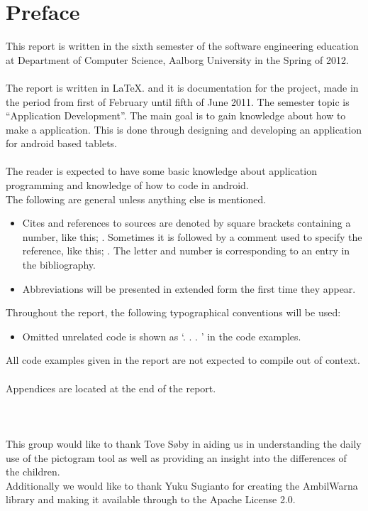 \chapter*{Preface}
This report is written in the sixth semester of the software engineering education at Department of Computer Science, Aalborg University in the Spring of 2012.  \\
\\
The report is written in \LaTeX. and it is documentation for the project, made in the period from first of February until fifth of June 2011.
The semester topic is ``Application Development''. The main goal is to gain knowledge about how to make a application. This is done through designing and developing an application for android based tablets.\\
\\
The reader is expected to have some basic knowledge about application programming and knowledge of how to code in android. \\
The following are general unless anything else is mentioned.

\begin{itemize}
\item Cites and references to sources are denoted by square brackets containing a number,  like this; \cite{XP}. Sometimes it is followed by a comment used to specify the reference, like this; \cite[Comment]{XP}. The letter and number is corresponding to an entry in the bibliography. 
\item Abbreviations will be presented in extended form the first time they appear. 
\end{itemize}

Throughout the report, the following typographical conventions will be used:
 
\begin{itemize}
\item Omitted unrelated code is shown as `. . . ’ in the code examples.
\end{itemize}

All code examples given in the report are not expected to compile out of context.\\
\\
Appendices are located at the end of the report. \\ \\  \\ \\

This group would like to thank Tove S\o{}by in aiding us in understanding the daily use of the pictogram tool as well as providing an insight into the differences of the children.\\
Additionally we would like to thank Yuku Sugianto for creating the AmbilWarna library and making it available through to the Apache License 2.0. \cite{ambilw} 

